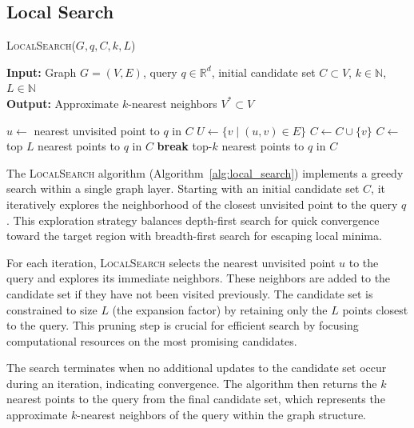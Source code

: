 \documentclass{article}
\begin{document}
\subsection{Local Search}

\begin{algorithm}
\caption{\textsc{LocalSearch}($G, q, C, k, L$)}\label{alg:local_search}
\textbf{Input:} Graph $G = (V, E)$, query $q \in \mathbb{R}^d$, initial candidate set $C \subset V$, $k \in \mathbb{N}$, $L \in \mathbb{N}$ \\
\textbf{Output:} Approximate $k$-nearest neighbors $V^* \subset V$
\begin{algorithmic}[1]
    \State $u \gets$ nearest unvisited point to $q$ in $C$
    \State $U \gets \{v \mid (u, v) \in E\}$
            \State $C \gets C \cup \{v\}$
        \EndIf
    \EndFor
        \State $C \gets$ top $L$ nearest points to $q$ in $C$
    \EndIf
        \State \textbf{break}
    \EndIf
\EndWhile
\State \Return top-$k$ nearest points to $q$ in $C$
\end{algorithmic}
\end{algorithm}

The \textsc{LocalSearch} algorithm (Algorithm~\ref{alg:local_search}) implements a greedy search within a single graph layer. Starting with an initial candidate set $C$, it iteratively explores the neighborhood of the closest unvisited point to the query $q$. This exploration strategy balances depth-first search for quick convergence toward the target region with breadth-first search for escaping local minima.

For each iteration, \textsc{LocalSearch} selects the nearest unvisited point $u$ to the query and explores its immediate neighbors. These neighbors are added to the candidate set if they have not been visited previously. The candidate set is constrained to size $L$ (the expansion factor) by retaining only the $L$ points closest to the query. This pruning step is crucial for efficient search by focusing computational resources on the most promising candidates.

The search terminates when no additional updates to the candidate set occur during an iteration, indicating convergence. The algorithm then returns the $k$ nearest points to the query from the final candidate set, which represents the approximate $k$-nearest neighbors of the query within the graph structure.
\end{document}

